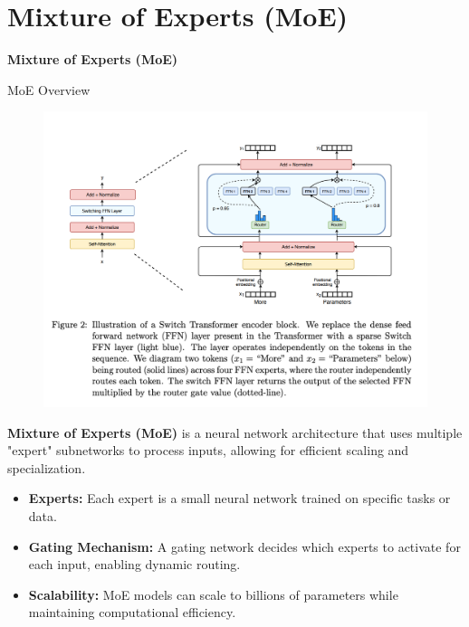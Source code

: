 \section{Mixture of Experts (MoE)}
\begin{frame}{}
    \LARGE \textbf{Mixture of Experts (MoE)}
\end{frame}

\begin{frame}[allowframebreaks]{MoE Overview}
    \begin{figure}
        \centering
        \includegraphics[height=0.9\textheight,width=1\textwidth,keepaspectratio]{images/recent-advance/moe-switch-transformer.png}
    \end{figure}
\framebreak

    \textbf{Mixture of Experts (MoE)} is a neural network architecture that uses multiple "expert" subnetworks to process inputs, allowing for efficient scaling and specialization.

    \begin{itemize}
        \item \textbf{Experts:} Each expert is a small neural network trained on specific tasks or data.
        \item \textbf{Gating Mechanism:} A gating network decides which experts to activate for each input, enabling dynamic routing.
        \item \textbf{Scalability:} MoE models can scale to billions of parameters while maintaining computational efficiency.
    \end{itemize}
\end{frame}

